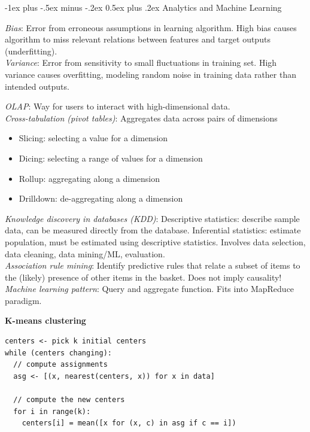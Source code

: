 \documentclass[10pt,landscape]{article}
\makeatletter
\renewcommand{\section}{\@startsection{section}{1}{0mm}%
                                {-1ex plus -.5ex minus -.2ex}%
                                {0.5ex plus .2ex}%
                                {\normalfont\large\bfseries}}
\makeatother
\begin{document}
\begin{multicols}{3}

\section{Analytics and Machine Learning}

\textit{Bias}: Error from erroneous assumptions in learning algorithm. High bias causes algorithm to miss relevant relations between features and target outputs (underfitting). \\
\textit{Variance}: Error from sensitivity to small fluctuations in training set. High variance causes overfitting, modeling random noise in training data rather than intended outputs.

\textit{OLAP}: Way for users to interact with high-dimensional data. \\
\textit{Cross-tabulation (pivot tables)}: Aggregates data across pairs of dimensions

\begin{itemize}
  \item Slicing: selecting a value for a dimension
  \item Dicing: selecting a range of values for a dimension
  \item Rollup: aggregating along a dimension
  \item Drilldown: de-aggregating along a dimension
\end{itemize}

\textit{Knowledge discovery in databases (KDD)}: Descriptive statistics: describe sample data, can be measured directly from the database. Inferential statistics: estimate population, must be estimated using descriptive statistics. Involves data selection, data cleaning, data mining/ML, evaluation. \\
\textit{Association rule mining}: Identify predictive rules that relate a subset of items to the (likely) presence of other items in the basket. Does not imply causality! \\
\textit{Machine learning pattern}: Query and aggregate function. Fits into MapReduce paradigm.

\textbf{K-means clustering}

\begin{verbatim}
centers <- pick k initial centers
while (centers changing):
  // compute assignments
  asg <- [(x, nearest(centers, x)) for x in data]

  // compute the new centers
  for i in range(k):
    centers[i] = mean([x for (x, c) in asg if c == i])
\end{verbatim}


\end{multicols}
\end{document}
